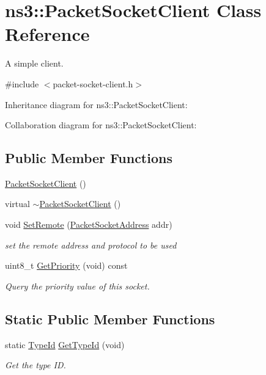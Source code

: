 \hypertarget{classns3_1_1PacketSocketClient}{}\section{ns3\+:\+:Packet\+Socket\+Client Class Reference}
\label{classns3_1_1PacketSocketClient}


A simple client.  




{\ttfamily \#include $<$packet-\/socket-\/client.\+h$>$}



Inheritance diagram for ns3\+:\+:Packet\+Socket\+Client\+:


Collaboration diagram for ns3\+:\+:Packet\+Socket\+Client\+:
\subsection*{Public Member Functions}
\begin{DoxyCompactItemize}
\item 
\hyperlink{classns3_1_1PacketSocketClient_aabfe4375491e38176de051f1832094b2}{Packet\+Socket\+Client} ()
\item 
virtual \hyperlink{classns3_1_1PacketSocketClient_a3be38a4a72be7d0a53a60eda71a7e1b7}{$\sim$\+Packet\+Socket\+Client} ()
\item 
void \hyperlink{classns3_1_1PacketSocketClient_ae400727c451d429358b5c85838b901df}{Set\+Remote} (\hyperlink{classns3_1_1PacketSocketAddress}{Packet\+Socket\+Address} addr)
\begin{DoxyCompactList}\small\item\em set the remote address and protocol to be used \end{DoxyCompactList}\item 
uint8\+\_\+t \hyperlink{classns3_1_1PacketSocketClient_a61245cdcc0e0d6a077288211991741be}{Get\+Priority} (void) const 
\begin{DoxyCompactList}\small\item\em Query the priority value of this socket. \end{DoxyCompactList}\end{DoxyCompactItemize}
\subsection*{Static Public Member Functions}
\begin{DoxyCompactItemize}
\item 
static \hyperlink{classns3_1_1TypeId}{Type\+Id} \hyperlink{classns3_1_1PacketSocketClient_a0a45e7e1e1441f28ca706d52bdd24d95}{Get\+Type\+Id} (void)
\begin{DoxyCompactList}\small\item\em Get the type ID. \end{DoxyCompactList}\end{DoxyCompactItemize}
